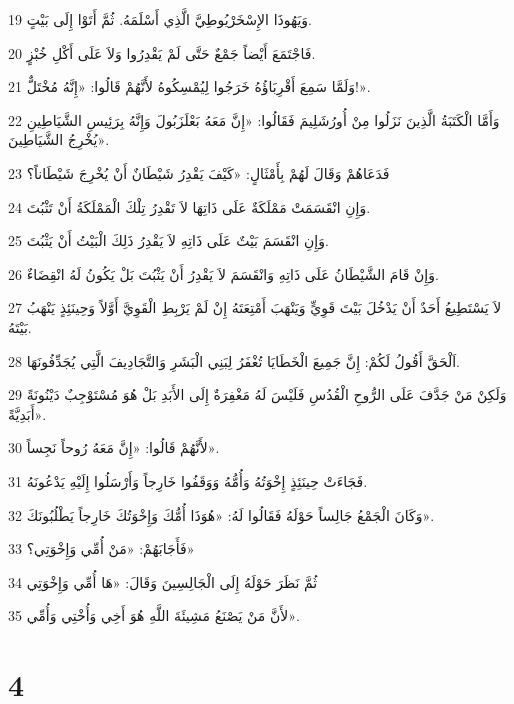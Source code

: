 \par 19 وَيَهُوذَا الإِسْخَرْيُوطِيَّ الَّذِي أَسْلَمَهُ. ثُمَّ أَتَوْا إِلَى بَيْتٍ.
\par 20 فَاجْتَمَعَ أَيْضاً جَمْعٌ حَتَّى لَمْ يَقْدِرُوا وَلاَ عَلَى أَكْلِ خُبْزٍ.
\par 21 وَلَمَّا سَمِعَ أَقْرِبَاؤُهُ خَرَجُوا لِيُمْسِكُوهُ لأَنَّهُمْ قَالُوا: «إِنَّهُ مُخْتَلٌّ!».
\par 22 وَأَمَّا الْكَتَبَةُ الَّذِينَ نَزَلُوا مِنْ أُورُشَلِيمَ فَقَالُوا: «إِنَّ مَعَهُ بَعْلَزَبُولَ وَإِنَّهُ بِرَئِيسِ الشَّيَاطِينِ يُخْرِجُ الشَّيَاطِينَ».
\par 23 فَدَعَاهُمْ وَقَالَ لَهُمْ بِأَمْثَالٍ: «كَيْفَ يَقْدِرُ شَيْطَانٌ أَنْ يُخْرِجَ شَيْطَاناً؟
\par 24 وَإِنِ انْقَسَمَتْ مَمْلَكَةٌ عَلَى ذَاتِهَا لاَ تَقْدِرُ تِلْكَ الْمَمْلَكَةُ أَنْ تَثْبُتَ.
\par 25 وَإِنِ انْقَسَمَ بَيْتٌ عَلَى ذَاتِهِ لاَ يَقْدِرُ ذَلِكَ الْبَيْتُ أَنْ يَثْبُتَ.
\par 26 وَإِنْ قَامَ الشَّيْطَانُ عَلَى ذَاتِهِ وَانْقَسَمَ لاَ يَقْدِرُ أَنْ يَثْبُتَ بَلْ يَكُونُ لَهُ انْقِضَاءٌ.
\par 27 لاَ يَسْتَطِيعُ أَحَدٌ أَنْ يَدْخُلَ بَيْتَ قَوِيٍّ وَيَنْهَبَ أَمْتِعَتَهُ إِنْ لَمْ يَرْبِطِ الْقَوِيَّ أَوَّلاً وَحِينَئِذٍ يَنْهَبُ بَيْتَهُ.
\par 28 اَلْحَقَّ أَقُولُ لَكُمْ: إِنَّ جَمِيعَ الْخَطَايَا تُغْفَرُ لِبَنِي الْبَشَرِ وَالتَّجَادِيفَ الَّتِي يُجَدِّفُونَهَا.
\par 29 وَلَكِنْ مَنْ جَدَّفَ عَلَى الرُّوحِ الْقُدُسِ فَلَيْسَ لَهُ مَغْفِرَةٌ إِلَى الأَبَدِ بَلْ هُوَ مُسْتَوْجِبٌ دَيْنُونَةً أَبَدِيَّةً».
\par 30 لأَنَّهُمْ قَالُوا: «إِنَّ مَعَهُ رُوحاً نَجِساً».
\par 31 فَجَاءَتْ حِينَئِذٍ إِخْوَتُهُ وَأُمُّهُ وَوَقَفُوا خَارِجاً وَأَرْسَلُوا إِلَيْهِ يَدْعُونَهُ.
\par 32 وَكَانَ الْجَمْعُ جَالِساً حَوْلَهُ فَقَالُوا لَهُ: «هُوَذَا أُمُّكَ وَإِخْوَتُكَ خَارِجاً يَطْلُبُونَكَ».
\par 33 فَأَجَابَهُمْ: «مَنْ أُمِّي وَإِخْوَتِي؟»
\par 34 ثُمَّ نَظَرَ حَوْلَهُ إِلَى الْجَالِسِينَ وَقَالَ: «هَا أُمِّي وَإِخْوَتِي
\par 35 لأَنَّ مَنْ يَصْنَعُ مَشِيئَةَ اللَّهِ هُوَ أَخِي وَأُخْتِي وَأُمِّي».

\chapter{4}

